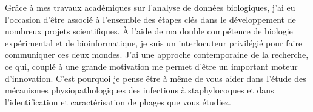 \documentclass[11pt, a4paper]{awesome-cv}
\begin{document}
\begin{cvletter}
Grâce à mes travaux académiques sur l’analyse de données biologiques, j’ai eu l’occasion d’être associé à l'ensemble des étapes clés dans le développement de nombreux projets scientifiques. À l’aide de ma double compétence de biologie expérimental et de bioinformatique, je suis un interlocuteur privilégié pour faire communiquer ces deux mondes. J'ai une approche contemporaine de la recherche, ce qui, couplé à une grande motivation me permet d’être un important moteur d’innovation. C'est pourquoi je pense être à même de vous aider dans l’étude des mécanismes physiopathologiques des infections à staphylocoques et dans l’identification et caractérisation de phages que vous étudiez. 

\end{cvletter}


\makeletterclosing
\end{document}
